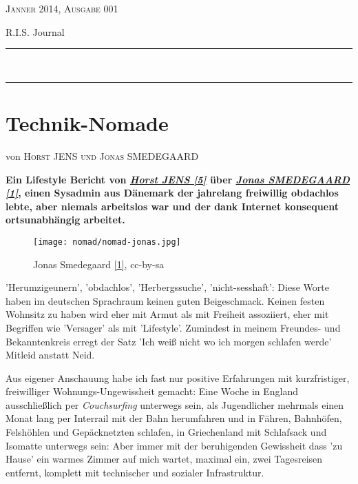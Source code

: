 \documentclass[10pt,a4paper,ngerman,twoside]{article} %
\newcommand{\HorRule}[1]{\noindent\rule{\linewidth}{#1}} %
\newcommand{\NewsletterName}[1]{ %
\begin{center}
\Huge \usefont{T1}{fvs}{b}{n} %
#1
\end{center}	
\par \normalsize \normalfont}
\newcommand{\JournalIssue}[1]{ %
\hfill \textsc{Jänner 2014, Ausgabe 001}
\par \normalsize \normalfont}
\newcommand{\NewsItem}[1]{ %
\usefont{T1}{fvs}{n}{n} %
\vspace{24pt}\large #1\vspace{3pt} %
\par \normalsize \normalfont}
\newcommand{\NewsAuthor}[1]{ %
\hfill von \textsc{#1} \vspace{20pt} %
\par \normalfont}
\begin{document}
\JournalIssue{1} %
\NewsletterName{R.I.S. Journal} %
\noindent\HorRule{3pt} \\[-0.75\baselineskip] %
\HorRule{1pt} %




%

\NewsItem{}
\section*{Technik-Nomade}
\label{nomad}
\NewsAuthor{Horst JENS und Jonas SMEDEGAARD}

\textbf{Ein Lifestyle Bericht von \href{http://spielend-programmieren.at}{\textit{Horst JENS [5]}} \"uber \href{http://dr.jones.dk}{\textit{Jonas SMEDEGAARD [1]}}, einen Sysadmin aus D\"anemark der jahrelang freiwillig obdachlos lebte, aber niemals arbeitslos war und der dank Internet konsequent ortsunabh\"angig arbeitet.}
\begin{figure}
\texttt{[image: nomad/nomad-jonas.jpg]}
\caption{Jonas Smedegaard \href{http://dr.jones.dk}{{[}1{]}}, cc-by-sa}
\end{figure}

'Herumzigeunern', 'obdachlos', 'Herbergssuche', 'nicht-sesshaft': Diese Worte haben im deutschen Sprachraum keinen guten Beigeschmack. Keinen festen Wohnsitz zu haben wird eher mit Armut als mit Freiheit assoziiert, eher mit Begriffen wie 'Versager' als mit 'Lifestyle'. Zumindest in meinem Freundes- und Bekanntenkreis erregt der Satz 'Ich weiß nicht wo ich morgen schlafen werde' Mitleid anstatt Neid.

Aus eigener Anschauung habe ich fast nur positive Erfahrungen mit kurzfristiger, freiwilliger Wohnungs-Ungewissheit gemacht: Eine Woche in England ausschließlich per \textit{Couchsurfing} unterwegs sein, als Jugendlicher mehrmals einen Monat lang per Interrail mit der Bahn herumfahren und in Fähren, Bahnhöfen, Felshöhlen und Gepäcknetzten schlafen, in Griechenland mit Schlafsack und Isomatte unterwegs sein: Aber immer mit der beruhigenden Gewissheit dass 'zu Hause' ein warmes Zimmer auf mich wartet, maximal ein, zwei Tagesreisen entfernt, komplett mit technischer und sozialer Infrastruktur. 
\end{document}
